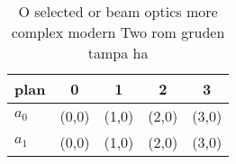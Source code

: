 \documentclass[a4paper]{article}
\begin{document}
\begin{table}
\begin{adjustbox}{width=0.5\columnwidth}
\begin{tabular}{|l|l|l|l|l|}
\hline
\textbf{plan} & \multicolumn{1}{c|}{\textbf{0}} & \multicolumn{1}{c|}{\textbf{1}} & \multicolumn{1}{c|}{\textbf{2}} & \multicolumn{1}{c|}{\textbf{3}} \\ \hline
\textbf{$a_0$}  & (0,0) & (1,0) & (2,0) & (3,0) \\ \hline
\textbf{$a_1$}  & (0,0) & (1,0) & (2,0) & (3,0) \\ \hline
\end{tabular}
\end{adjustbox}
\caption{O selected or beam optics more complex modern Two rom gruden tampa ha
}
\end{table}
\end{document}
